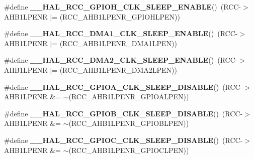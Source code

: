 \begin{DoxyCompactItemize}
\#define {\bfseries \+\_\+\+\_\+\+H\+A\+L\+\_\+\+R\+C\+C\+\_\+\+G\+P\+I\+O\+H\+\_\+\+C\+L\+K\+\_\+\+S\+L\+E\+E\+P\+\_\+\+E\+N\+A\+B\+LE}()~(R\+CC-\/$>$A\+H\+B1\+L\+P\+E\+NR $\vert$= (R\+C\+C\+\_\+\+A\+H\+B1\+L\+P\+E\+N\+R\+\_\+\+G\+P\+I\+O\+H\+L\+P\+EN))
\item 
\mbox{\label{group___r_c_c___a_h_b1___low_power___enable___disable_ga568e4d004285fe009bc4e5d33e13af61}} 
\#define {\bfseries \+\_\+\+\_\+\+H\+A\+L\+\_\+\+R\+C\+C\+\_\+\+D\+M\+A1\+\_\+\+C\+L\+K\+\_\+\+S\+L\+E\+E\+P\+\_\+\+E\+N\+A\+B\+LE}()~(R\+CC-\/$>$A\+H\+B1\+L\+P\+E\+NR $\vert$= (R\+C\+C\+\_\+\+A\+H\+B1\+L\+P\+E\+N\+R\+\_\+\+D\+M\+A1\+L\+P\+EN))
\item 
\mbox{\label{group___r_c_c___a_h_b1___low_power___enable___disable_ga16c048816a705de87bb5fd3ce4003a82}} 
\#define {\bfseries \+\_\+\+\_\+\+H\+A\+L\+\_\+\+R\+C\+C\+\_\+\+D\+M\+A2\+\_\+\+C\+L\+K\+\_\+\+S\+L\+E\+E\+P\+\_\+\+E\+N\+A\+B\+LE}()~(R\+CC-\/$>$A\+H\+B1\+L\+P\+E\+NR $\vert$= (R\+C\+C\+\_\+\+A\+H\+B1\+L\+P\+E\+N\+R\+\_\+\+D\+M\+A2\+L\+P\+EN))
\item 
\mbox{\label{group___r_c_c___a_h_b1___low_power___enable___disable_gad6753edbd9047eeac39ae4f234642942}} 
\#define {\bfseries \+\_\+\+\_\+\+H\+A\+L\+\_\+\+R\+C\+C\+\_\+\+G\+P\+I\+O\+A\+\_\+\+C\+L\+K\+\_\+\+S\+L\+E\+E\+P\+\_\+\+D\+I\+S\+A\+B\+LE}()~(R\+CC-\/$>$A\+H\+B1\+L\+P\+E\+NR \&= $\sim$(R\+C\+C\+\_\+\+A\+H\+B1\+L\+P\+E\+N\+R\+\_\+\+G\+P\+I\+O\+A\+L\+P\+EN))
\item 
\mbox{\label{group___r_c_c___a_h_b1___low_power___enable___disable_ga0a20ad851a2ef9e1ccdbf280dcd1dc44}} 
\#define {\bfseries \+\_\+\+\_\+\+H\+A\+L\+\_\+\+R\+C\+C\+\_\+\+G\+P\+I\+O\+B\+\_\+\+C\+L\+K\+\_\+\+S\+L\+E\+E\+P\+\_\+\+D\+I\+S\+A\+B\+LE}()~(R\+CC-\/$>$A\+H\+B1\+L\+P\+E\+NR \&= $\sim$(R\+C\+C\+\_\+\+A\+H\+B1\+L\+P\+E\+N\+R\+\_\+\+G\+P\+I\+O\+B\+L\+P\+EN))
\item 
\mbox{\label{group___r_c_c___a_h_b1___low_power___enable___disable_ga293f9870ba631d23f8011bad12420f83}} 
\#define {\bfseries \+\_\+\+\_\+\+H\+A\+L\+\_\+\+R\+C\+C\+\_\+\+G\+P\+I\+O\+C\+\_\+\+C\+L\+K\+\_\+\+S\+L\+E\+E\+P\+\_\+\+D\+I\+S\+A\+B\+LE}()~(R\+CC-\/$>$A\+H\+B1\+L\+P\+E\+NR \&= $\sim$(R\+C\+C\+\_\+\+A\+H\+B1\+L\+P\+E\+N\+R\+\_\+\+G\+P\+I\+O\+C\+L\+P\+EN))

\end{DoxyCompactItemize}
